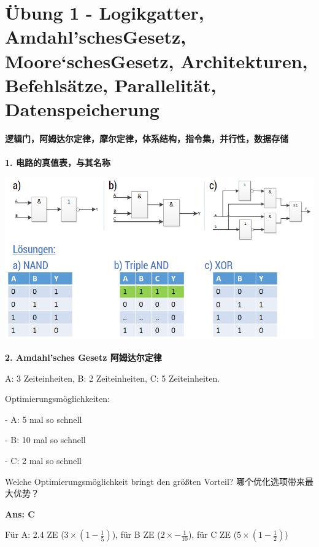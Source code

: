 \documentclass[fleqn]{article}
\begin{document}

\tableofcontents

\pagestyle{main}


\section{Übung 1 - Logikgatter, Amdahl'schesGesetz, Moore‘schesGesetz, Architekturen, Befehlsätze, Parallelität, Datenspeicherung}

\noindent\textbf{逻辑门，阿姆达尔定律，摩尔定律，体系结构，指令集，并行性，数据存储}
\\
\\
\noindent\textbf{1. 电路的真值表，与其名称}

\begin{center}
    \includegraphics[scale=0.6]{1.png}
\end{center}

\noindent\textbf{2. Amdahl'sches Gesetz 阿姆达尔定律}

A: 3 Zeiteinheiten, B: 2 Zeiteinheiten, C: 5 Zeiteinheiten.

Optimierungsmöglichkeiten:

\indent\indent - A: 5 mal so schnell

\indent\indent - B: 10 mal so schnell

\indent\indent - C: 2 mal so schnell

Welche Optimierungsmöglichkeit bringt den größten Vorteil? 哪个优化选项带来最大优势？

\textbf{Ans: C}

Für A: 2.4 ZE ($3\times(1-\frac{1}{5})$), für B ZE ($2\times-\frac{1}{10}$), für C ZE ($5\times(1-\frac{1}{2})$)
\end{document}
